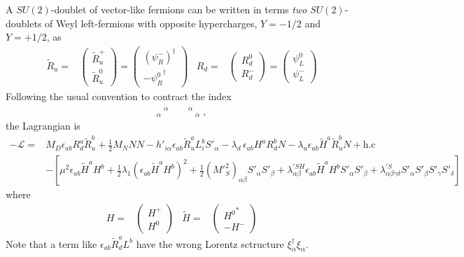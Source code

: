 A $SU(2)$-doublet of vector-like fermions can be written in terms
\emph{two} $SU(2)$-doublets of Weyl left-fermions with opposite
hypercharges, $Y=-1/2$ and $Y=+1/2$, as
\begin{align*}
  \widetilde{R}_{u}=&\begin{pmatrix}
\widetilde{R}_{u}^+\\    
\widetilde{R}_{u}^0
  \end{pmatrix}=
  \begin{pmatrix}
    \left( \psi_{R}^{-} \right)^{\dagger}\\
    -{\psi_{R}^{0}}^{\dagger}
  \end{pmatrix}
&  R_{d}=&\begin{pmatrix}
R_{d}^0\\    
R_{d}^-
  \end{pmatrix}=
  \begin{pmatrix}
    \psi_{L}^{0}\\
    \psi_{L}^{-}
  \end{pmatrix}
\end{align*}
Following the usual convention to contract the index
\begin{align}
  {}_{\alpha}\ {}^{\alpha} \qquad {}^{\dot{\alpha}}\ {}_{\dot{\alpha}}\;,
\end{align}
the Lagrangian is
\begin{align}
\label{eq:lt13aib}
  -\mathcal{L}=&M_D \epsilon_{ab}R^a_d \widetilde{R}^b_u+\tfrac{1}{2}M_N NN-h'_{i\alpha} \epsilon_{ab}\widetilde{R}_u^a L_{i}^b S'_{\alpha}-\lambda_d\, \epsilon_{ab}H^a R_d^b N-\lambda_u \epsilon_{ab}\widetilde{H}^a \widetilde{R}_u^b N+\text{h.c}\nonumber\\
&-\left[ \mu^2 \epsilon_{ab}\widetilde{H}^{a}H^b+\tfrac{1}{2}\lambda_1 \left( \epsilon_{ab} \widetilde{H}^{a}H^b\right)^2+\tfrac{1}{2}\left({M'}_S^2\right)_{\alpha\beta} S'_{\alpha}S'_\beta
   +\lambda^{\prime SH}_{\alpha\beta} \epsilon_{ab}\widetilde{H}^{a}H^bS'_{\alpha}S'_{\beta}+\lambda^{\prime S}_{\alpha\beta\gamma\delta}S'_{\alpha}S'_{\beta}S'_{\gamma}S'_{\delta}  \right]
\end{align}
where
\begin{align*}
  {H}=&  \begin{pmatrix}
    H^+ \\ H^0
  \end{pmatrix}&
  \widetilde{H}=&  \begin{pmatrix}
    {H^0}^{*} \\ -H^-
  \end{pmatrix}
\end{align*}
Note that a term like $\epsilon_{ab}\widetilde{R}_d^a L^b$ have the wrong Lorentz sctructure $\xi_{\dot{\alpha}}^{\dagger}\xi_{\alpha}$. 

